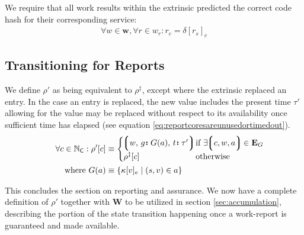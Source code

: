 We require that all work results within the extrinsic predicted the correct code hash for their corresponding service:
\begin{align}\label{eq:reportcodesarecorrect}
  \forall w \in \mathbf{w}, \forall r \in w_r : r_c = \delta[r_s]_c
\end{align}









\subsection{Transitioning for Reports}

We define $\rho'$ as being equivalent to $\rho^\ddagger$, except where the extrinsic replaced an entry. In the case an entry is replaced, the new value includes the present time $\tau'$ allowing for the value may be replaced without respect to its availability once sufficient time has elapsed (see equation \ref{eq:reportcoresareunusedortimedout}).
\begin{equation}
\begin{aligned}
    \forall c \in \N_\mathsf{C} : \rho'[c] &\equiv \begin{cases}
      \tup{w\ts\is{g}{G(a)}\ts\is{t}{\tau'}}\!\!\!\!\! &\when \exists \tup{c, w, a} \in \mathbf{E}_G \\
      \rho^\ddagger[c] &\otherwise
    \end{cases}\!\!\!\!\!\!\!\!\! \\
    \where G(a) &\equiv \{\kappa[v]_e \mid (s, v) \in a \}
\end{aligned}
\end{equation}

This concludes the section on reporting and assurance. We now have a complete definition of $\rho'$ together with $\mathbf{W}$ to be utilized in section \ref{sec:accumulation}, describing the portion of the state transition happening once a work-report is guaranteed and made available.
